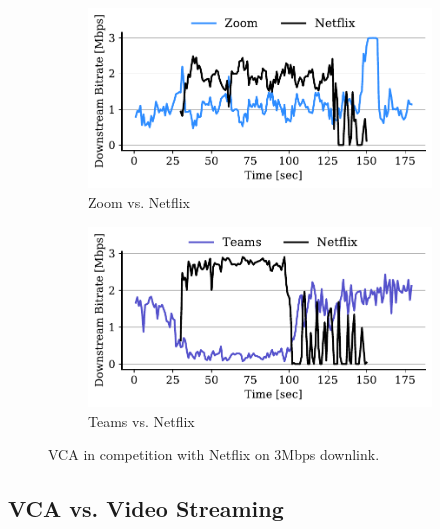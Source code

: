 \begin{figure}[t!]
\centering
\begin{subfigure}[t]{.45\textwidth}
    \centering
    \includegraphics[width=1\textwidth]{figures/comp_ts/zoom_netflix_3_dl_r3.pdf}
    \caption{Zoom vs. Netflix}
    \label{subfig:netflix-zoom}
\end{subfigure}\hfill
\begin{subfigure}[t]{.45\textwidth}
    \centering
    \includegraphics[width=1\textwidth]{figures/comp_ts/teams_netflix_3_dl_r3.pdf}
    \caption{Teams vs. Netflix}
    \label{subfig:netflix-teams}
\end{subfigure}
\caption{VCA in competition with Netflix on 3Mbps downlink.}
\label{fig:comp_netflix_zoom_teams}
\end{figure}


\subsection{VCA vs. Video Streaming}

